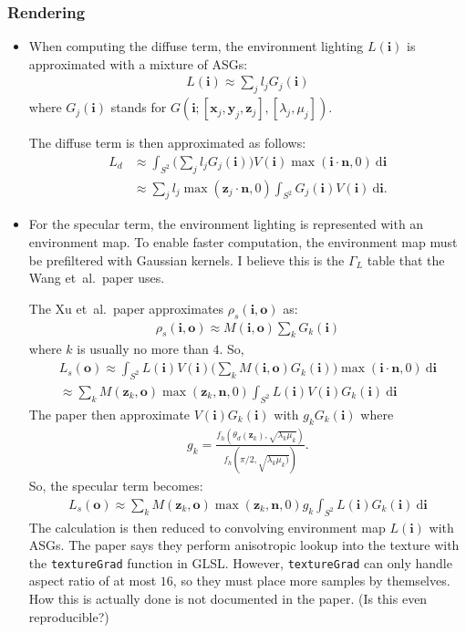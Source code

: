 \documentclass[10pt]{article}
\newcommand{\dee}{\mathrm{d}}
\newcommand{\ve}[1]{\mathbf{#1}}
\newcommand{\etal}{{et~al.}}
\begin{document}
  \subsubsection{Rendering}
  \begin{itemize}
    \item When computing the diffuse term, the environment lighting $L(\ve{i})$ is approximated with a mixture of ASGs:
    \begin{align*}
      L(\ve{i}) \approx \sum_{j} l_j G_j(\ve{i})
    \end{align*}
    where $G_j(\ve{i})$ stands for $G(\ve{i};[\ve{x}_j, \ve{y}_j, \ve{z}_j], [\lambda_j, \mu_j]).$

    The diffuse term is then approximated as follows:
    \begin{align*}
      L_d 
      &\approx \int_{S^2} \bigg( \sum_j l_j G_j(\ve{i}) \bigg) V(\ve{i}) \max(\ve{i} \cdot \ve{n}, 0)\ \dee\ve{i} \\
      &\approx \sum_{j} l_j \max(\ve{z}_j \cdot \ve{n}, 0) \int_{S^2} G_j(\ve{i}) V(\ve{i})\ \dee\ve{i}.
    \end{align*}

    \item For the specular term, the environment lighting is represented with an environment map.  To enable faster computation, the environment map must be prefiltered with Gaussian kernels.  I believe this is the $\Gamma_L$ table that the Wang \etal\ paper uses.

    The Xu \etal\ paper approximates $\rho_s(\ve{i},\ve{o})$ as:
    \begin{align*}
      \rho_s(\ve{i},\ve{o}) \approx M(\ve{i},\ve{o}) \sum_k G_k(\ve{i})
    \end{align*}
    where $k$ is usually no more than $4$.  So,
    \begin{align*}
      L_s(\ve{o}) 
      \approx \int_{S^2} L(\ve{i}) V(\ve{i}) \bigg( \sum_k M(\ve{i}, \ve{o}) G_k(\ve{i}) \bigg) \max(\ve{i} \cdot \ve{n}, 0)\ \dee\ve{i} \\
      \approx \sum_k M(\ve{z}_k, \ve{o}) \max(\ve{z}_k, \ve{n}, 0) \int_{S^2} L(\ve{i}) V(\ve{i}) G_k(\ve{i})\ \dee\ve{i}
    \end{align*}
    The paper then approximate $V(\ve{i})G_k(\ve{i})$ with $g_k G_k(\ve{i})$ where
    \begin{align*}
      g_k = \frac{f_h(\theta_d(\ve{z}_k), \sqrt{\lambda_k\mu_k})}{f_h(\pi/2, \sqrt{\lambda_k\mu_k)})}.
    \end{align*}
    So, the specular term becomes:
    \begin{align*}
      L_s(\ve{o}) 
      \approx \sum_k M(\ve{z}_k, \ve{o}) \max(\ve{z}_k, \ve{n}, 0) g_k \int_{S^2} L(\ve{i}) G_k(\ve{i})\ \dee\ve{i}
    \end{align*}
    The calculation is then reduced to convolving environment map $L(\ve{i})$ with ASGs.  The paper says they perform anisotropic lookup into the texture with the \texttt{textureGrad} function in GLSL.  However, \texttt{textureGrad} can only handle aspect ratio of at most $16$, so they must place more samples by themselves.  How this is actually done is not documented in the paper.  (Is this even reproducible?)
  \end{itemize}
\end{document}
